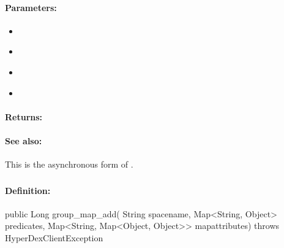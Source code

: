 \paragraph{Parameters:}
\begin{itemize}[noitemsep]
\item {}\\

\item {}\\

\item {}\\

\item {}\\

\end{itemize}

\paragraph{Returns:}


\paragraph{See also:}  This is the asynchronous form of .

\pagebreak
\subsubsection{}
\label{api:java:group_map_add}


\paragraph{Definition:}
\begin{javacode}
public Long group_map_add(
        String spacename,
        Map<String, Object> predicates,
        Map<String, Map<Object, Object>> mapattributes) throws HyperDexClientException
\end{javacode}

